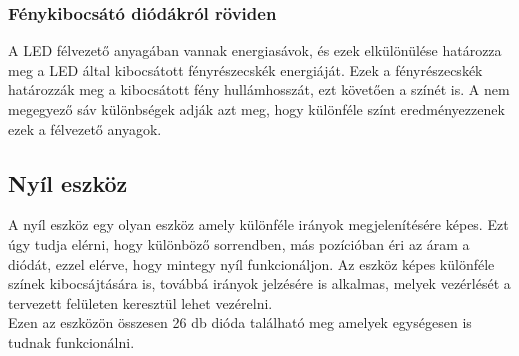 \documentclass[tocnopagenum]{thesis-ekf}
\theoremstyle{definition}
\theoremstyle{remark}
\begin{document}
	\subsubsection{Fénykibocsátó diódákról röviden}
	A LED félvezető anyagában vannak energiasávok, és ezek elkülönülése határozza meg a LED által kibocsátott fényrészecskék energiáját.
	Ezek a fényrészecskék határozzák meg a kibocsátott fény hullámhosszát, ezt követően a színét is. A nem megegyező sáv különbségek adják azt meg, hogy különféle színt eredményezzenek ezek a félvezető anyagok.\cite{leds_magazi}
	\subsection{Nyíl eszköz}
	A nyíl eszköz egy olyan eszköz amely különféle irányok megjelenítésére képes. Ezt úgy tudja elérni, hogy különböző sorrendben, más pozícióban éri az áram a diódát, ezzel elérve, hogy mintegy nyíl funkcionáljon.
	Az eszköz képes különféle színek kibocsájtására is, továbbá irányok jelzésére is alkalmas, melyek vezérlését a tervezett felületen keresztül lehet vezérelni. 
	\\
	Ezen az eszközön összesen 26 db dióda található meg amelyek egységesen is tudnak funkcionálni.	
	\\
\end{document}
